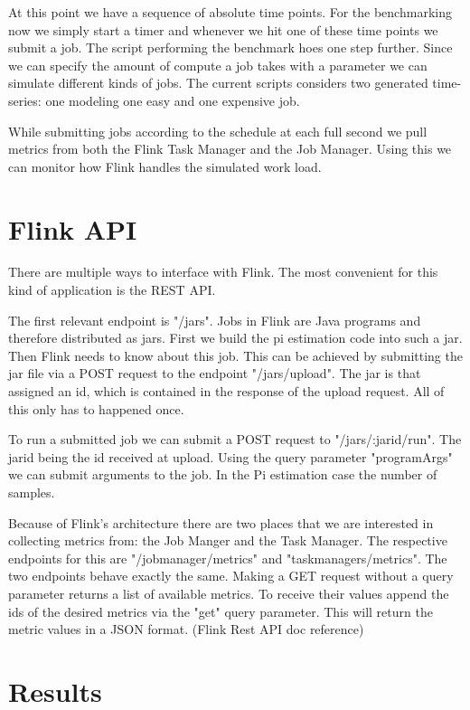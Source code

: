 At this point we have a sequence of absolute time points. For the benchmarking now we simply start a timer and whenever we hit one of these time points we submit a job. The script performing the benchmark hoes one step further. Since we can specify the amount of compute a job takes with a parameter we can simulate different kinds of jobs. The current scripts considers two generated time-series: one modeling one easy and one expensive job. \parencite{flinktest}

While submitting jobs according to the schedule at each full second we pull metrics from both the Flink Task Manager and the Job Manager. Using this we can monitor how Flink handles the simulated work load.

\section{Flink API}

There are multiple ways to interface with Flink. The most convenient for this kind of application is the REST API. 

The first relevant endpoint is "/jars". Jobs in Flink are Java programs and therefore distributed as jars. First we build the pi estimation code into such a jar. Then Flink needs to know about this job. This can be achieved by submitting the jar file via a POST request to the endpoint "/jars/upload". The jar is that assigned an id, which is contained in the response of the upload request. All of this only has to happened once. 

To run a submitted job we can submit a POST request to "/jars/:jarid/run". The jarid being the id received at upload. Using the query parameter "programArgs" we can submit arguments to the job. In the Pi estimation case the number of samples. 

Because of Flink's architecture there are two places that we are interested in collecting metrics from: the Job Manger and the Task Manager. The respective endpoints for this are "/jobmanager/metrics" and "taskmanagers/metrics". The two endpoints behave exactly the same. Making a GET request without a query parameter returns a list of available metrics. To receive their values append the ids of the desired metrics via the "get" query parameter. This will return the metric values in a JSON format. (Flink Rest API doc reference)

\section{Results}



